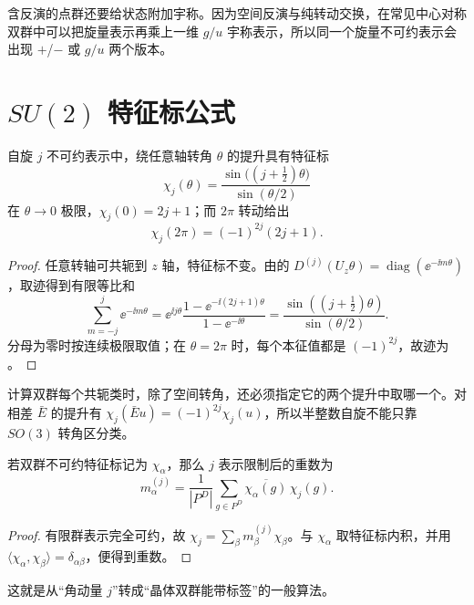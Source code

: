 含反演的点群还要给状态附加宇称。因为空间反演与纯转动交换，在常见中心对称双群中可以把旋量表示再乘上一维 $g/u$ 宇称表示，所以同一个旋量不可约表示会出现 $+$/$-$ 或 $g/u$ 两个版本。

\section{\texorpdfstring{$SU(2)$ 特征标公式}{SU(2) 特征标公式}}

\begin{proposition}[$SU(2)$ 表示限制到双群的特征标]
自旋 $j$ 不可约表示中，绕任意轴转角 $\theta$ 的提升具有特征标
\begin{equation}
\chi_j(\theta)=\frac{\sin\bigl((j+\tfrac12)\theta\bigr)}{\sin(\theta/2)}
\label{eq:su2-character-angle}
\end{equation}
在 $\theta\to0$ 极限，$\chi_j(0)=2j+1$；而 $2\pi$ 转动给出
\begin{equation}
\chi_j(2\pi)=(-1)^{2j}(2j+1).
\label{eq:central-double-character}
\end{equation}
\end{proposition}
\begin{proof}
任意转轴可共轭到 $z$ 轴，特征标不变。由的 $D^{(j)}(U_z\theta)=\operatorname{diag}(\ee^{-\ii m\theta})$，取迹得到有限等比和
\[
\sum_{m=-j}^j\ee^{-\ii m\theta}
=\ee^{\ii j\theta}\frac{1-\ee^{-\ii(2j+1)\theta}}{1-\ee^{-\ii\theta}}
=\frac{\sin((j+\tfrac12)\theta)}{\sin(\theta/2)}.
\]
分母为零时按连续极限取值；在 $\theta=2\pi$ 时，每个本征值都是 $(-1)^{2j}$，故迹为 。
\end{proof}
计算双群每个共轭类时，除了空间转角，还必须指定它的两个提升中取哪一个。对相差 $\bar E$ 的提升有 $\chi_j(\bar E u)=(-1)^{2j}\chi_j(u)$，所以半整数自旋不能只靠 $SO(3)$ 转角区分类。

\begin{proposition}[双群限制的重数公式]
若双群不可约特征标记为 $\chi_\alpha$，那么 $j$ 表示限制后的重数为
\begin{equation}
m_\alpha^{(j)}
=\frac1{|P^D|}\sum_{g\in P^D}
\overline{\chi_\alpha(g)}\,\chi_j(g).
\label{eq:double-group-multiplicity}
\end{equation}
\end{proposition}
\begin{proof}
有限群表示完全可约，故 $\chi_j=\sum_\beta m_\beta^{(j)}\chi_\beta$。与 $\chi_\alpha$ 取特征标内积，并用 $\langle\chi_\alpha,\chi_\beta\rangle=\delta_{\alpha\beta}$，便得到重数。
\end{proof}
这就是从“角动量 $j$”转成“晶体双群能带标签”的一般算法。

